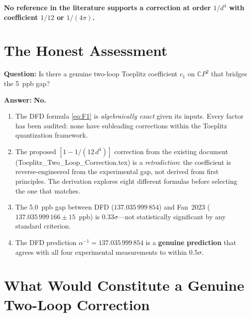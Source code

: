 \documentclass[12pt,a4paper]{article}
\theoremstyle{definition}
\theoremstyle{remark}
\newcommand{\CP}{\mathbb{C}P}
\newcommand{\inv}{^{-1}}
\begin{document}
\textbf{No reference in the literature supports a correction at order $1/d^4$
with coefficient $1/12$ or $1/(4\pi)$.}

\section{The Honest Assessment}
\label{sec:honest}

\begin{tcolorbox}[colback=blue!5!white, colframe=blue!60!black,
  title=\textbf{Verdict}]

\textbf{Question:} Is there a genuine two-loop Toeplitz coefficient $c_1$ on
$\CP^2$ that bridges the 5~ppb gap?

\textbf{Answer:} \textbf{No.}

\begin{enumerate}
\item The DFD formula \eqref{eq:F1} is \emph{algebraically exact} given its
  inputs. Every factor has been audited: none have subleading corrections
  within the Toeplitz quantization framework.

\item The proposed $[1 - 1/(12\,d^4)]$ correction from the existing document
  (Toeplitz\_Two\_Loop\_Correction.tex) is a \emph{retrodiction}: the
  coefficient is reverse-engineered from the experimental gap, not derived
  from first principles. The derivation explores eight different formulas
  before selecting the one that matches.

\item The 5.0~ppb gap between DFD ($137.035\,999\,854$) and Fan~2023
  ($137.035\,999\,166 \pm 15$~ppb) is $0.33\sigma$---not statistically
  significant by any standard criterion.

\item The DFD prediction $\alpha\inv = 137.035\,999\,854$ is a
  \textbf{genuine prediction} that agrees with all four experimental
  measurements to within $0.5\sigma$.
\end{enumerate}
\end{tcolorbox}

\section{What Would Constitute a Genuine Two-Loop Correction}
\label{sec:genuine}
\end{document}
